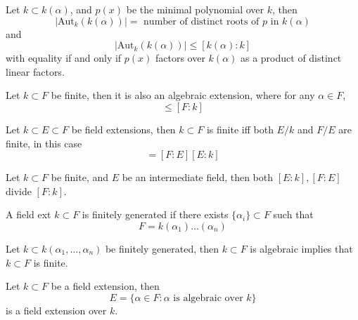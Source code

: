 \documentclass[openany]{book}
\begin{document}
\begin{cor}
    Let $k\subset k(\alpha)$, and $p(x)$ be the minimal polynomial over $k$, then 
    \begin{equation*}
        |\text{Aut}_k(k(\alpha))|=\text{ number of distinct roots of $p$ in $k(\alpha)$}
    \end{equation*}
    and 
    \begin{equation*}
        |\text{Aut}_k(k(\alpha))|\leq [k(\alpha):k]
    \end{equation*}
    with equality if and only if $p(x)$ factors over $k(\alpha)$ as a product of distinct linear factors.
\end{cor}


\begin{prop}
    Let $k\subset F$ be finite, then it is also an algebraic extension, where for any $\alpha\in F$, 
    \begin{equation*}
        [k(\alpha):k]\leq [F: k]
    \end{equation*}
\end{prop}



\begin{prop}
    Let $k\subset E\subset F$ be field extensions, then $k\subset F$ is finite iff both $E/k$ and $F/E$ are finite, in this case 
    \begin{equation*}
        [F:k]=[F:E][E:k]
    \end{equation*}
\end{prop}


\begin{cor}
    Let $k\subset F$ be finite, and $E$ be an intermediate field, then both $[E:k],[F:E]$ divide $[F:k]$.
\end{cor}

\begin{defn}
    A field ext $k\subset F$  is finitely generated if there exists $\{\alpha_i\}\subset F$ such that 
    \begin{equation*}
        F=k(\alpha_1)\dots(\alpha_n)
    \end{equation*}
\end{defn}


\begin{prop}
    Let $k\subset k(\alpha_1,\dots,\alpha_n)$ be finitely generated, then
    $k\subset F$ is algebraic implies that $k\subset F$ is finite.
\end{prop}


\begin{cor}
    Let $k\subset F$ be a field extension, then 
    \begin{equation*}
        E=\{\alpha\in F: \alpha\text{ is algebraic over $k$}\}
    \end{equation*}
    is a field extension over $k$.
\end{cor}
\end{document}
